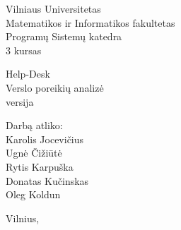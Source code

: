 \begin{titlepage}
    \begin{center}

        {\large
            Vilniaus Universitetas \\
            Matematikos ir Informatikos fakultetas \\
            Programų Sistemų katedra \\
            3 kursas
        }

        \vspace{\fill}

        {\huge
            Help-Desk
        } \\[0.5cm]
        {\large
            Verslo poreikių analizė \\
            \versionString{} versija
        }

        \vspace{3cm}

        \begin{flushright}
            \begin{minipage}{0.4\textwidth}
                Darbą atliko: \\
                Karolis Jocevičius \\
                Ugnė Čižiūtė \\
                Rytis Karpuška \\
                Donatas Kučinskas \\
                Oleg Koldun
            \end{minipage}
        \end{flushright}

        \vspace{\fill}

        {\large Vilnius, \the\year}

    \end{center}
\end{titlepage}
